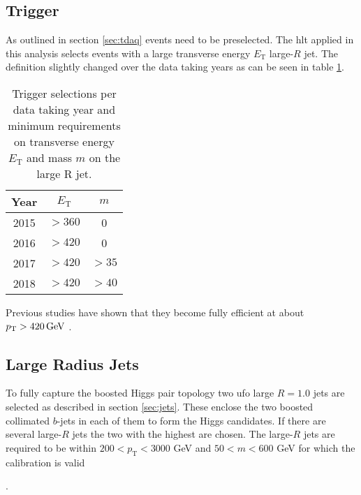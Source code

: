 \subsection{Trigger}
As outlined in section \ref{sec:tdaq} events need to be preselected. The \ac{hlt} applied in this analysis selects events with a large transverse energy $E_\text{T}$ large-$R$ jet. The definition slightly changed over the data taking years as can be seen in table \ref{tab:trigger}.
\begin{table}[htbp]
    \centering
    \caption{Trigger selections per data taking year and minimum requirements on transverse energy $E_\text{T}$ and mass $m$ on the large R jet. }
    \begin{tabular}{ccc}
        \hline
        Year & $E_\text{T}$ & $m$   \\ \hline
        2015 & $>360$       & 0     \\
        2016 & $>420$       & 0     \\
        2017 & $>420$       & $>35$ \\
        2018 & $>420$       & $>40$ \\ \hline
    \end{tabular}
    \label{tab:trigger}
\end{table}
Previous studies have shown that they become fully efficient at about $p_{\text{T}}>\qty[]{420}{GeV}$ \citep{ATL-COM-PHYS-2020-083,ATL-COM-PHYS-2023-033}.

\subsection{Large Radius Jets}
To fully capture the boosted Higgs pair topology two \ac{ufo} large $R=1.0$ jets are selected as described in section \ref{sec:jets}. These enclose the two boosted collimated $b$-jets in each of them to form the Higgs candidates. If there are several large-$R$ jets the two with the highest \pt are chosen. The large-$R$ jets are required to be within $200<p_{\text{T}}<3000$ GeV and $50<m<600$ GeV for which the calibration is valid

.


